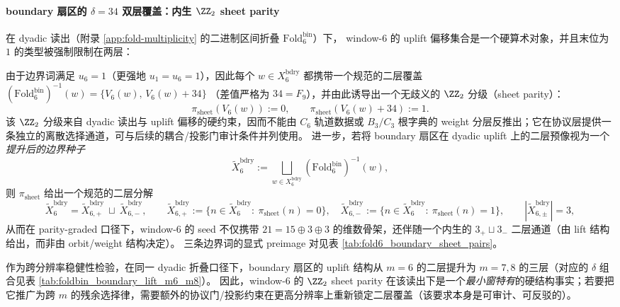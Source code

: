 \paragraph{boundary 扇区的 \texorpdfstring{$\delta=34$}{δ=34} 双层覆盖：内生 \texorpdfstring{$\ZZ_2$}{Z2} sheet parity}
在 dyadic 读出（附录 \ref{app:fold-multiplicity} 的二进制区间折叠 \(\mathrm{Fold}^{\mathrm{bin}}_6\)）下，
window-6 的 uplift 偏移集合是一个硬算术对象，并且末位为 \(1\) 的类型被强制限制在两层：

由于边界词满足 \(u_6=1\)（更强地 \(u_1=u_6=1\)），因此每个 \(w\in X_6^{\mathrm{bdry}}\) 都携带一个规范的二层覆盖
\(
(\mathrm{Fold}^{\mathrm{bin}}_6)^{-1}(w)=\{V_6(w),\,V_6(w)+34\}
\)
（差值严格为 \(34=F_9\)），并由此诱导出一个无歧义的 \(\ZZ_2\) 分级（sheet parity）：
\[
\pi_{\mathrm{sheet}}(V_6(w)):=0,\qquad \pi_{\mathrm{sheet}}(V_6(w)+34):=1.
\]
该 \(\ZZ_2\) 分级来自 dyadic 读出与 uplift 偏移的硬约束，因而不能由 \(C_6\) 轨道数据或 \(B_3/C_3\) 根字典的 weight 分层反推出；它在协议层提供一条独立的离散选择通道，可与后续的耦合/投影门审计条件并列使用。
进一步，若将 boundary 扇区在 dyadic uplift 上的二层预像视为一个\emph{提升后的边界种子}
\[
\widetilde X_6^{\mathrm{bdry}}
:=\bigsqcup_{w\in X_6^{\mathrm{bdry}}}(\mathrm{Fold}^{\mathrm{bin}}_6)^{-1}(w),
\]
则 \(\pi_{\mathrm{sheet}}\) 给出一个规范的二层分解
\[
\widetilde X_6^{\mathrm{bdry}}=\widetilde X^{\mathrm{bdry}}_{6,+}\ \sqcup\ \widetilde X^{\mathrm{bdry}}_{6,-},
\qquad
\widetilde X^{\mathrm{bdry}}_{6,+}:=\{n\in\widetilde X_6^{\mathrm{bdry}}:\ \pi_{\mathrm{sheet}}(n)=0\},
\quad
\widetilde X^{\mathrm{bdry}}_{6,-}:=\{n\in\widetilde X_6^{\mathrm{bdry}}:\ \pi_{\mathrm{sheet}}(n)=1\},
\qquad
|\widetilde X^{\mathrm{bdry}}_{6,\pm}|=3,
\]
从而在 parity-graded 口径下，window-6 的 seed 不仅携带 \(21=15\oplus 3\oplus 3\) 的维数骨架，还伴随一个内生的 \(3_+\sqcup 3_-\) 二层通道（由 lift 结构给出，而非由 orbit/weight 结构决定）。
三条边界词的显式 preimage 对见表 \ref{tab:fold6_boundary_sheet_pairs}。

作为跨分辨率稳健性检验，在同一 dyadic 折叠口径下，boundary 扇区的 uplift 结构从 \(m=6\) 的二层提升为 \(m=7,8\) 的三层（对应的 \(\delta\) 组合见表 \ref{tab:foldbin_boundary_lift_m6_m8}）。
因此，window-6 的 \(\ZZ_2\) sheet parity 在该读出下是一个\emph{最小窗特有}的硬结构事实；若要把它推广为跨 \(m\) 的残余选择律，需要额外的协议门/投影约束在更高分辨率上重新锁定二层覆盖（该要求本身是可审计、可反驳的）。


